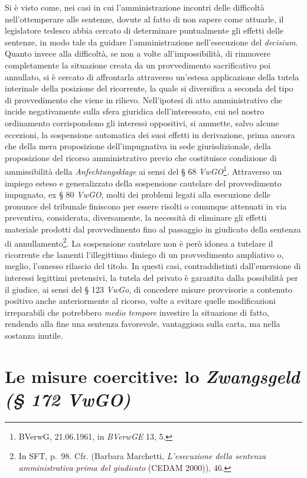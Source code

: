 \documentclass[12pt,it,a4paper,]{report}
\begin{document}
Si è visto come, nei casi in cui l'amministrazione incontri delle
difficoltà nell'ottemperare alle sentenze, dovute al fatto di non sapere
come attuarle, il legislatore tedesco abbia cercato di determinare
puntualmente gli effetti delle sentenze, in modo tale da guidare
l'amministrazione nell'esecuzione del \emph{decisium}. Quanto invece
alla difficoltà, se non a volte all'impossibilità, di rimuovere
completamente la situazione creata da un provvedimento sacrificativo poi
annullato, si è cercato di affrontarla attraverso un'estesa applicazione
della tutela interinale della posizione del ricorrente, la quale si
diversifica a seconda del tipo di provvedimento che viene in rilievo.
Nell'ipotesi di atto amministrativo che incide negativamente sulla sfera
giuridica dell'interessato, cui nel nostro ordinamento corrispondono gli
interessi oppositivi, si ammette, salvo alcune eccezioni, la sospensione
automatica dei suoi effetti in derivazione, prima ancora che della mera
proposizione dell'impugnativa in sede giurisdizionale, della
proposizione del ricorso amministrativo previo che costituisce
condizione di ammissibilità della \emph{Anfechtungsklage} ai sensi del §
68 \emph{VwGO}\footnote{BVerwG, 21.06.1961, in \emph{BVerwGE} 13, 5.}.
Attraverso un impiego esteso e generalizzato della sospensione cautelare
del provvedimento impugnato, ex § 80 \emph{VwGO}, molti dei problemi
legati alla esecuzione delle pronunce del tribunale finiscono per essere
risolti o comunque attenuati in via preventiva, considerata,
diversamente, la necessità di eliminare gli effetti materiale prodotti
dal provvedimento fino al passaggio in giudicato della sentenza di
annullamento\footnote{In SFT, p.~98. Cfr. (Barbara Marchetti,
  \emph{L'esecuzione della sentenza amministrativa prima del giudicato}
  (CEDAM 2000)), 46.}. La sospensione cautelare non è però idonea a
tutelare il ricorrente che lamenti l'illegittimo diniego di un
provvedimento ampliativo o, meglio, l'omesso rilascio del titolo. In
questi casi, contraddistinti dall'emersione di interessi legittimi
pretensivi, la tutela del privato è garantita dalla possibilità per il
giudice, ai sensi del § 123 \emph{VwGo}, di concedere misure provvisorie
a contenuto positivo anche anteriormente al ricorso, volte a evitare
quelle modificazioni irreparabili che potrebbero \emph{medio tempore}
investire la situazione di fatto, rendendo alla fine una sentenza
favorevole, vantaggiosa sulla carta, ma nella sostanza inutile.

\hypertarget{le-misure-coercitive-lo-zwangsgeld-172-vwgo}{%
\section{\texorpdfstring{Le misure coercitive: lo \emph{Zwangsgeld (§
172
VwGO)}}{Le misure coercitive: lo Zwangsgeld (§ 172 VwGO)}}\label{le-misure-coercitive-lo-zwangsgeld-172-vwgo}}
\end{document}
